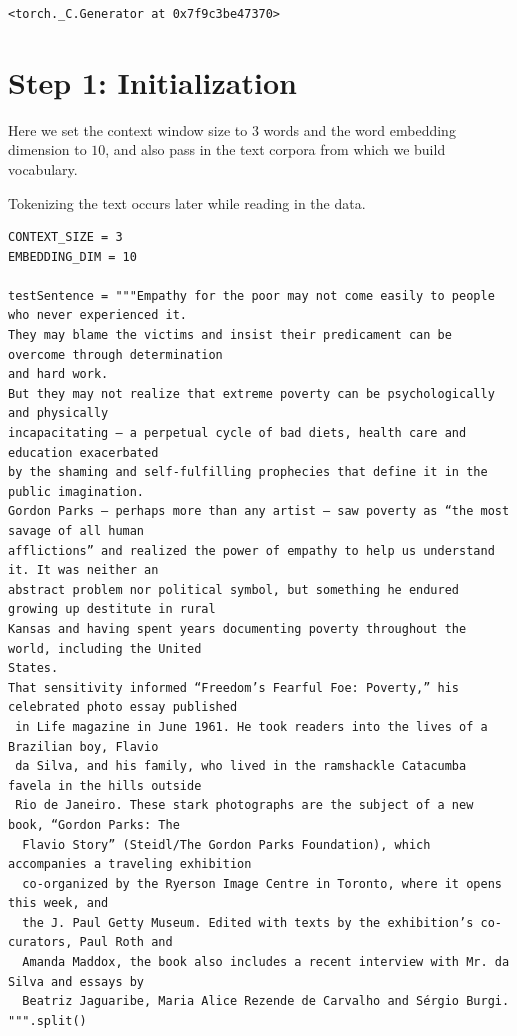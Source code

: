 \documentclass[
]{article}
\begin{document}
\begin{verbatim}
<torch._C.Generator at 0x7f9c3be47370>
\end{verbatim}

\hypertarget{step-1-initialization}{%
\section{Step 1: Initialization}\label{step-1-initialization}}

Here we set the context window size to \(3\) words and the word
embedding dimension to \(10\), and also pass in the text corpora from
which we build vocabulary.

Tokenizing the text occurs later while reading in the data.

\begin{verbatim}
CONTEXT_SIZE = 3
EMBEDDING_DIM = 10

testSentence = """Empathy for the poor may not come easily to people who never experienced it.
They may blame the victims and insist their predicament can be overcome through determination
and hard work.
But they may not realize that extreme poverty can be psychologically and physically
incapacitating — a perpetual cycle of bad diets, health care and education exacerbated
by the shaming and self-fulfilling prophecies that define it in the public imagination.
Gordon Parks — perhaps more than any artist — saw poverty as “the most savage of all human
afflictions” and realized the power of empathy to help us understand it. It was neither an
abstract problem nor political symbol, but something he endured growing up destitute in rural
Kansas and having spent years documenting poverty throughout the world, including the United
States.
That sensitivity informed “Freedom’s Fearful Foe: Poverty,” his celebrated photo essay published
 in Life magazine in June 1961. He took readers into the lives of a Brazilian boy, Flavio
 da Silva, and his family, who lived in the ramshackle Catacumba favela in the hills outside
 Rio de Janeiro. These stark photographs are the subject of a new book, “Gordon Parks: The
  Flavio Story” (Steidl/The Gordon Parks Foundation), which accompanies a traveling exhibition
  co-organized by the Ryerson Image Centre in Toronto, where it opens this week, and
  the J. Paul Getty Museum. Edited with texts by the exhibition’s co-curators, Paul Roth and
  Amanda Maddox, the book also includes a recent interview with Mr. da Silva and essays by
  Beatriz Jaguaribe, Maria Alice Rezende de Carvalho and Sérgio Burgi.
""".split()
\end{verbatim}
\end{document}
